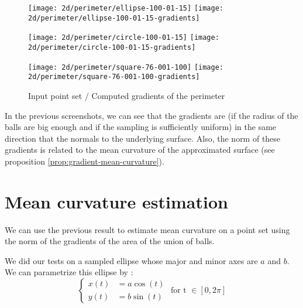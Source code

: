 \begin{figure}[h]
    \centering

    \begin{minipage}{0.8\linewidth}
        \centering
        \texttt{[image: 2d/perimeter/ellipse-100-01-15]}
        \texttt{[image: 2d/perimeter/ellipse-100-01-15-gradients]}
        \label{fig:gradients_perimeter_2d_ellipse}
    \end{minipage}

    \begin{minipage}{0.8\linewidth}
        \centering
        \texttt{[image: 2d/perimeter/circle-100-01-15]}
        \texttt{[image: 2d/perimeter/circle-100-01-15-gradients]}
        \label{fig:gradients_perimeter_2d_circle}
    \end{minipage}

    \begin{minipage}{0.8\linewidth}
        \centering
        \texttt{[image: 2d/perimeter/square-76-001-100]}
        \texttt{[image: 2d/perimeter/square-76-001-100-gradients]}
        \label{fig:gradients_perimeter_2d_square}
    \end{minipage}

    \caption{Input point set / Computed gradients of the perimeter}
    \label{fig:gradients_perimeter_2d}
\end{figure}

In the previous screenshots, we can see that the gradients are (if the radius of
the balls are big enough and if the sampling is sufficiently uniform) in the
same direction that the normals to the underlying surface. Also, the norm of
these gradients is related to the mean curvature of the approximated surface
(see proposition \ref{prop:gradient-mean-curvature}).

\section{Mean curvature estimation}

We can use the previous result to estimate mean curvature on a point set using
the norm of the gradients of the area of the union of balls.

We did our tests on a sampled ellipse whose major and minor axes are $ a $ and $ b $. We
can parametrize this ellipse by :
$$
\begin{cases}
    x(t) &= a \cos (t) \\
    y(t) &= b \sin (t)
\end{cases}
\text{ for t } \in [ 0, 2\pi ]
$$


